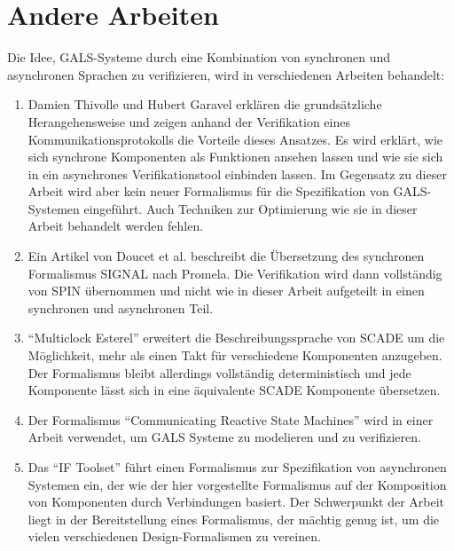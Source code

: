 \section{Andere Arbeiten}
Die Idee, GALS-Systeme durch eine Kombination von synchronen und asynchronen Sprachen zu verifizieren, wird in verschiedenen Arbeiten behandelt:
\begin{enumerate}
\item Damien Thivolle und Hubert Garavel erklären die grundsätzliche Herangehensweise und zeigen anhand der Verifikation eines Kommunikationsprotokolls die Vorteile dieses Ansatzes\cite{gals_sam}.
Es wird erklärt, wie sich synchrone Komponenten als Funktionen ansehen lassen und wie sie sich in ein asynchrones Verifikationstool einbinden lassen.
Im Gegensatz zu dieser Arbeit wird aber kein neuer Formalismus für die Spezifikation von GALS-Systemen eingeführt.
Auch Techniken zur Optimierung wie sie in dieser Arbeit behandelt werden fehlen.
\item Ein Artikel von Doucet et al. beschreibt die Übersetzung des synchronen Formalismus SIGNAL nach Promela\cite{gals_signal}.
  Die Verifikation wird dann vollständig von SPIN übernommen und nicht wie in dieser Arbeit aufgeteilt in einen synchronen und asynchronen Teil.
\item "`Multiclock Esterel"' erweitert die Beschreibungssprache von SCADE um die Möglichkeit, mehr als einen Takt für verschiedene Komponenten anzugeben\cite{multiclock_esterel}.
  Der Formalismus bleibt allerdings vollständig deterministisch und jede Komponente lässt sich in eine äquivalente SCADE Komponente übersetzen.
\item Der Formalismus "`Communicating Reactive State Machines"' wird in einer Arbeit verwendet, um GALS Systeme zu modelieren und zu verifizieren\cite{gals_crsm}.
\item Das "`IF Toolset"' führt einen Formalismus zur Spezifikation von asynchronen Systemen ein, der wie der hier vorgestellte Formalismus auf der Komposition von Komponenten durch Verbindungen basiert\cite{if_toolset}.
  Der Schwerpunkt der Arbeit liegt in der Bereitstellung eines Formalismus, der mächtig genug ist, um die vielen verschiedenen Design-Formalismen zu vereinen.
\end{enumerate}
